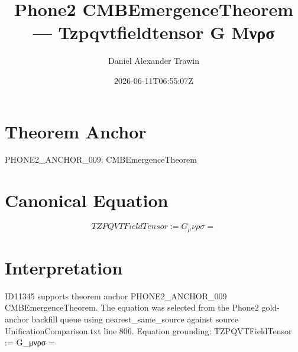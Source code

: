 \documentclass[11pt]{article}
\title{Phone2 CMBEmergenceTheorem — Tzpqvtfieldtensor G Μνρσ}
\author{Daniel Alexander Trawin}
\date{2026-06-11T06:55:07Z}
\begin{document}
\maketitle
\section*{Theorem Anchor}
PHONE2_ANCHOR_009: CMBEmergenceTheorem
\section*{Canonical Equation}
\[
TZPQVTFieldTensor := G_μνρσ =
\]
\section*{Interpretation}
ID11345 supports theorem anchor PHONE2_ANCHOR_009 CMBEmergenceTheorem. The equation was selected from the Phone2 gold-anchor backfill queue using nearest_same_source against source UnificationComparison.txt line 806. Equation grounding: TZPQVTFieldTensor := G_μνρσ =
\end{document}
